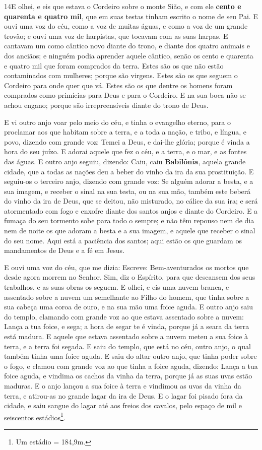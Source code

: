 \medskip

\lettrine{14} E olhei, e eis que estava o Cordeiro sobre o
monte Sião, e com ele \textbf{cento e quarenta e quatro mil}, que em
suas testas tinham escrito o nome de seu Pai. E ouvi uma voz do
céu, como a voz de muitas águas, e como a voz de um grande trovão; e
ouvi uma voz de harpistas, que tocavam com as suas harpas. E
cantavam um como cântico novo diante do trono, e diante dos quatro
animais e dos anciãos; e ninguém podia aprender aquele cântico,
senão os cento e quarenta e quatro mil que foram comprados da terra.
Estes são os que não estão contaminados com mulheres; porque são
virgens. Estes são os que seguem o Cordeiro para onde quer que vá.
Estes são os que dentre os homens foram comprados como primícias
para Deus e para o Cordeiro. E na sua boca não se achou engano;
porque são irrepreensíveis diante do trono de Deus.

E vi outro anjo voar pelo meio do céu, e tinha o evangelho eterno,
para o proclamar aos que habitam sobre a terra, e a toda a nação, e
tribo, e língua, e povo, dizendo com grande voz: Temei a Deus, e
dai-lhe glória; porque é vinda a hora do seu juízo. E adorai aquele
que fez o céu, e a terra, e o mar, e as fontes das águas. E
outro anjo seguiu, dizendo: Caiu, caiu \textbf{Babilônia}, aquela
grande cidade, que a todas as nações deu a beber do vinho da ira da
sua prostituição. E seguiu-os o terceiro anjo, dizendo com
grande voz: Se alguém adorar a besta, e a sua imagem, e receber o
sinal na sua testa, ou na sua mão, também este beberá do
vinho da ira de Deus, que se deitou, não misturado, no cálice da sua
ira; e será atormentado com fogo e enxofre diante dos santos anjos e
diante do Cordeiro. E a fumaça do seu tormento sobe para todo
o sempre; e não têm repouso nem de dia nem de noite os que adoram a
besta e a sua imagem, e aquele que receber o sinal do seu nome.
Aqui está a paciência dos santos; aqui estão os que guardam
os mandamentos de Deus e a fé em Jesus.

E ouvi uma voz do céu, que me dizia: Escreve: Bem-aventurados os
mortos que desde agora morrem no Senhor. Sim, diz o Espírito, para
que descansem dos seus trabalhos, e as suas obras os seguem.
E olhei, e eis uma nuvem branca, e assentado sobre a nuvem um
semelhante ao Filho do homem, que tinha sobre a sua cabeça uma coroa
de ouro, e na sua mão uma foice aguda. E outro anjo saiu do
templo, clamando com grande voz ao que estava assentado sobre a
nuvem: Lança a tua foice, e sega; a hora de segar te é vinda, porque
já a seara da terra está madura. E aquele que estava
assentado sobre a nuvem meteu a sua foice à terra, e a terra foi
segada. E saiu do templo, que está no céu, outro anjo, o qual
também tinha uma foice aguda. E saiu do altar outro anjo, que
tinha poder sobre o fogo, e clamou com grande voz ao que tinha a
foice aguda, dizendo: Lança a tua foice aguda, e vindima os cachos
da vinha da terra, porque já as suas uvas estão maduras. E o
anjo lançou a sua foice à terra e vindimou as uvas da vinha da
terra, e atirou-as no grande lagar da ira de Deus. E o lagar
foi pisado fora da cidade, e saiu sangue do lagar até aos freios dos
cavalos, pelo espaço de mil e seiscentos estádios\footnote{Um
estádio = 184,9m.}.

